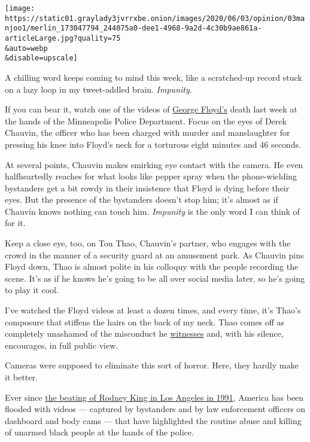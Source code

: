 \texttt{[image: https://static01.graylady3jvrrxbe.onion/images/2020/06/03/opinion/03manjoo1/merlin\_173047794\_244075a0-dee1-4968-9a2d-4c30b9ae861a-articleLarge.jpg?quality=75\\\&auto=webp\\\&disable=upscale]}

A chilling word keeps coming to mind this week, like a scratched-up
record stuck on a lazy loop in my tweet-addled brain. \emph{Impunity}.

If you can bear it, watch one of the videos of
\href{https://www.nytimes3xbfgragh.onion/2020/06/04/us/politics/george-floyd-witness-maurice-lester-hall.html}{George
Floyd's} death last week at the hands of the Minneapolis Police
Department. Focus on the eyes of Derek Chauvin, the officer who has been
charged with murder and manslaughter for pressing his knee into Floyd's
neck for a torturous eight minutes and 46 seconds.

At several points, Chauvin makes smirking eye contact with the camera.
He even halfheartedly reaches for what looks like pepper spray when the
phone-wielding bystanders get a bit rowdy in their insistence that Floyd
is dying before their eyes. But the presence of the bystanders doesn't
stop him; it's almost as if Chauvin knows nothing can touch him.
\emph{Impunity} is the only word I can think of for it.

Keep a close eye, too, on Tou Thao, Chauvin's partner, who engages with
the crowd in the manner of a security guard at an amusement park. As
Chauvin pins Floyd down, Thao is almost polite in his colloquy with the
people recording the scene. It's as if he knows he's going to be all
over social media later, so he's going to play it cool.

I've watched the Floyd videos at least a dozen times, and every time,
it's Thao's composure that stiffens the hairs on the back of my neck.
Thao comes off as completely unashamed of the misconduct he
\href{https://www.nytimes3xbfgragh.onion/2020/06/04/us/politics/george-floyd-witness-maurice-lester-hall.html}{witnesses}
and, with his silence, encourages, in full public view.

Cameras were supposed to eliminate this sort of horror. Here, they
hardly make it better.

Ever since
\href{https://www.nytimes3xbfgragh.onion/1991/03/07/us/tape-of-beating-by-police-revives-charges-of-racism.html}{the
beating of Rodney King in Los Angeles in 1991}, America has been flooded
with videos --- captured by bystanders and by law enforcement officers
on dashboard and body cams --- that have highlighted the routine abuse
and killing of unarmed black people at the hands of the police.

